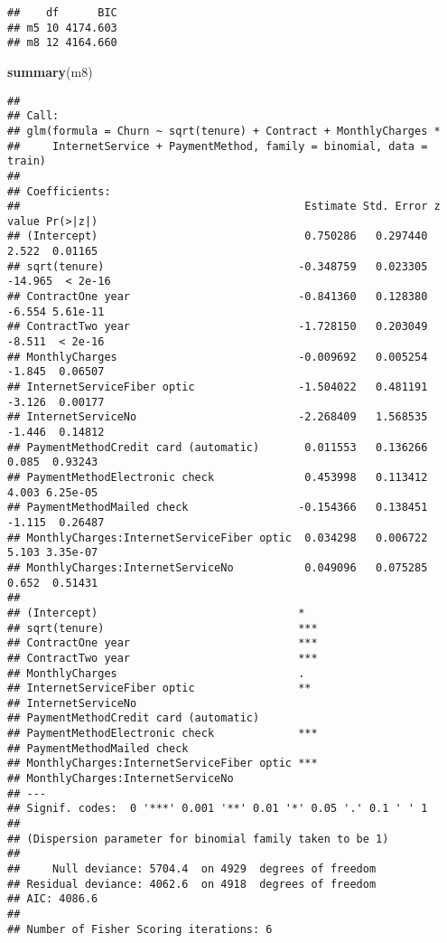 \documentclass[
]{article}
\newenvironment{Shaded}{\begin{snugshade}}{\end{snugshade}}
\newcommand{\FunctionTok}[1]{\textcolor[rgb]{0.13,0.29,0.53}{\textbf{#1}}}
\newcommand{\NormalTok}[1]{#1}
\begin{document}
\begin{verbatim}
##    df      BIC
## m5 10 4174.603
## m8 12 4164.660
\end{verbatim}

\begin{Shaded}
\begin{Highlighting}[]
\FunctionTok{summary}\NormalTok{(m8)}
\end{Highlighting}
\end{Shaded}

\begin{verbatim}
## 
## Call:
## glm(formula = Churn ~ sqrt(tenure) + Contract + MonthlyCharges * 
##     InternetService + PaymentMethod, family = binomial, data = train)
## 
## Coefficients:
##                                            Estimate Std. Error z value Pr(>|z|)
## (Intercept)                                0.750286   0.297440   2.522  0.01165
## sqrt(tenure)                              -0.348759   0.023305 -14.965  < 2e-16
## ContractOne year                          -0.841360   0.128380  -6.554 5.61e-11
## ContractTwo year                          -1.728150   0.203049  -8.511  < 2e-16
## MonthlyCharges                            -0.009692   0.005254  -1.845  0.06507
## InternetServiceFiber optic                -1.504022   0.481191  -3.126  0.00177
## InternetServiceNo                         -2.268409   1.568535  -1.446  0.14812
## PaymentMethodCredit card (automatic)       0.011553   0.136266   0.085  0.93243
## PaymentMethodElectronic check              0.453998   0.113412   4.003 6.25e-05
## PaymentMethodMailed check                 -0.154366   0.138451  -1.115  0.26487
## MonthlyCharges:InternetServiceFiber optic  0.034298   0.006722   5.103 3.35e-07
## MonthlyCharges:InternetServiceNo           0.049096   0.075285   0.652  0.51431
##                                              
## (Intercept)                               *  
## sqrt(tenure)                              ***
## ContractOne year                          ***
## ContractTwo year                          ***
## MonthlyCharges                            .  
## InternetServiceFiber optic                ** 
## InternetServiceNo                            
## PaymentMethodCredit card (automatic)         
## PaymentMethodElectronic check             ***
## PaymentMethodMailed check                    
## MonthlyCharges:InternetServiceFiber optic ***
## MonthlyCharges:InternetServiceNo             
## ---
## Signif. codes:  0 '***' 0.001 '**' 0.01 '*' 0.05 '.' 0.1 ' ' 1
## 
## (Dispersion parameter for binomial family taken to be 1)
## 
##     Null deviance: 5704.4  on 4929  degrees of freedom
## Residual deviance: 4062.6  on 4918  degrees of freedom
## AIC: 4086.6
## 
## Number of Fisher Scoring iterations: 6
\end{verbatim}
\end{document}
